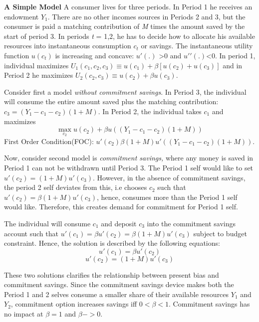 \documentclass[a4paper,12pt]{article}
\begin{document}
\textbf{A Simple Model}
A consumer lives for three periods. In Period 1 he receives an endowment $Y_1$. There are no other incomes sources in Periods 2 and 3, but the consumer is paid a matching contribution of \textit{M} times the amount saved by the start of period 3. In periods \textit{t} = 1,2, he has to decide how to allocate his available resources into instantaneous consumption $c_t$ or savings. The instantaneous utility function $u(c_t)$ is increasing and concave: $u\prime(.)$ >0 and $u\prime\prime(.)$<0. In period 1, individual maximizes $U_1(c_1,c_2,c_3) \equiv u(c_1) + \beta [u(c_2)+u(c_3)]$ and in Period 2 he maximizes $U_2(c_2,c_3) \equiv u(c_2) + \beta u(c_3)$. 

Consider first a model \textit{without commitment savings}. In Period 3, the individual will consume the entire amount saved plus the matching contribution: $c_3=(Y_1-c_1-c_2)(1+M).$ In Period 2, the individual takes $c_1$ and maximizes 
$$\max_{c_2} u(c_2)+\beta u((Y_1-c_1-c_2)(1+M)) $$
First Order Condition(FOC): $u\prime (c_2)\beta(1+M)u\prime((Y_1-c_1-c_2)(1+M)).$

Now, consider second model is \textit{commitment savings,} where any money is saved in Period 1 can not be withdrawn until Period 3. The Period 1 self would like to set $u\prime(c_2)=(1+M)u\prime(c_3)$. However, in the absence of commitment savings, the period 2 self deviates from this, i.e chooses $c_2$ such that $u\prime(c_2)=\beta(1+M)u\prime(c_3)$, hence, consumes more than the Period 1 self would like. Therefore, this creates demand for commitment for Period 1 self. 

The individual will consume $c_1$ and deposit $c_3$ into the commitment savings account such that $u\prime(c_1)=\beta u\prime(c_2)=\beta(1+M)u\prime(c_3)$ subject to budget constraint. Hence, the solution is described by the following equations: $$u\prime(c_1)=\beta u\prime(c_2)$$ $$u\prime(c_2)=(1+M)u\prime(c_3)$$

These two solutions clarifies the relationship between present bias and commitment savings. Since the commitment savings device makes both the Period 1 and 2 selves consume a smaller share of their available resources $Y_1$ and $Y_2$, commitment option increases savings iff $0<\beta<1$. Commitment savings has no impact at $\beta=1$ and $\beta ->0$. 
\end{document}
